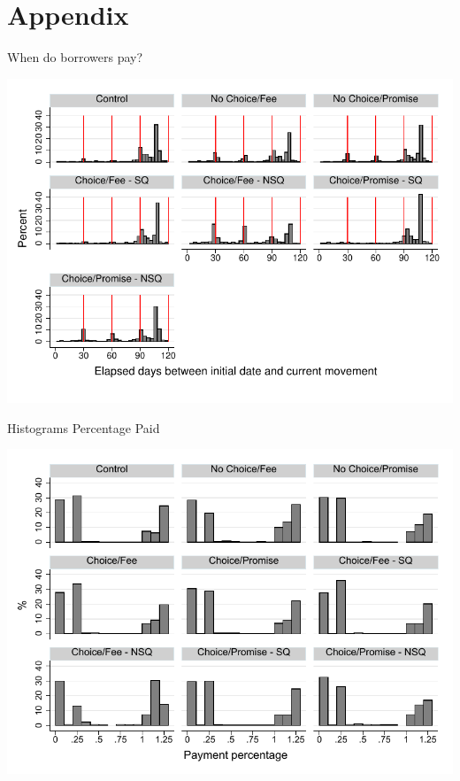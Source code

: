 \documentclass[9pt]{beamer}
\begin{document}
\section{Appendix}



\begin{frame}{When do borrowers pay?}
    \begin{center}
        \includegraphics[width=\textwidth]{Figuras/hist_payments.pdf}
    \end{center}
\end{frame}


\begin{frame}{Histograms Percentage Paid}
    \begin{center}
        \includegraphics[width=.9\textwidth]{Figuras/hist_perc_payment.pdf}
    \end{center}
\end{frame}
\end{document}
